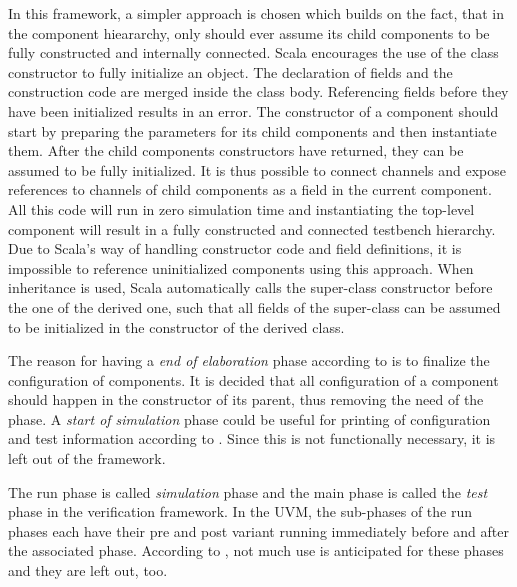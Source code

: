 In this framework, a simpler approach is chosen which builds on the fact, that in the component hieararchy, only
should ever assume its child components to be fully constructed and internally connected. Scala encourages the use of
the class constructor to fully initialize an object. The declaration of fields and the construction code are merged
inside the class body. Referencing fields before they have been initialized results in an error. The constructor of a
component should start by preparing the parameters for its child components and then instantiate them. After the
child components constructors have returned, they can be assumed to be fully initialized. It is thus possible to
connect channels and expose references to channels of child components as a field in the current component. All this
code will run in zero simulation time and instantiating the top-level component will result in a fully constructed
and connected testbench hierarchy. Due to Scala's way of handling constructor code and field definitions, it is
impossible to reference uninitialized components using this approach. When inheritance is used, Scala automatically
calls the super-class constructor before the one of the derived one, such that all fields of the super-class can be
assumed to be initialized in the constructor of the derived class.

The reason for having a \textit{end of elaboration} phase according to \cite[Ch 4.6]{mehta2018asic} is to finalize
the configuration of components. It is decided that all configuration of a component should happen in the constructor
of its parent, thus removing the need of the phase. A \textit{start of simulation} phase could be useful for printing
of configuration and test information according to \cite[4.6]{mehta2018asic}. Since this is not functionally
necessary, it is left out of the framework.

The run phase is called \textit{simulation} phase and the main phase is called the \textit{test} phase in the
verification framework. In the UVM, the sub-phases of the run phases each have their pre and post variant running
immediately before and
after the associated phase. According to \cite[Ch 4.6]{mehta2018asic}, not much use is anticipated for these phases
and they are left out, too.

